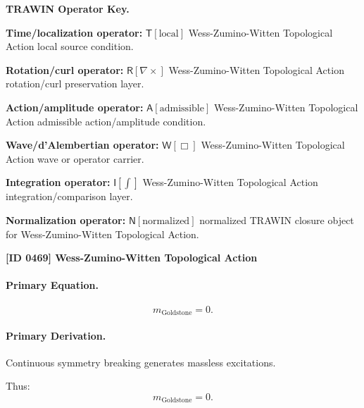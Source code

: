 \par\vspace{0.45\baselineskip}
\noindent\begin{minipage}[t]{\linewidth}
\begingroup
\small
\raggedright
\textbf{TRAWIN Operator Key.}\par
\noindent\textbf{Time/localization operator:} $\mathsf{T}\!\left[\mathrm{local}\right]$ Wess-Zumino-Witten Topological Action local source condition.\par
\noindent\textbf{Rotation/curl operator:} $\mathsf{R}\!\left[\nabla\times\right]$ Wess-Zumino-Witten Topological Action rotation/curl preservation layer.\par
\noindent\textbf{Action/amplitude operator:} $\mathsf{A}\!\left[\mathrm{admissible}\right]$ Wess-Zumino-Witten Topological Action admissible action/amplitude condition.\par
\noindent\textbf{Wave/d'Alembertian operator:} $\mathsf{W}\!\left[\Box\right]$ Wess-Zumino-Witten Topological Action wave or operator carrier.\par
\noindent\textbf{Integration operator:} $\mathsf{I}\!\left[\int\right]$ Wess-Zumino-Witten Topological Action integration/comparison layer.\par
\noindent\textbf{Normalization operator:} $\mathsf{N}\!\left[\mathrm{normalized}\right]$ normalized TRAWIN closure object for Wess-Zumino-Witten Topological Action.\par
\endgroup
\end{minipage}

\clearpage
\noindent\textbf{[ID 0469] Wess-Zumino-Witten Topological Action}\par
\vspace{0.35em}
\paragraph{Primary Equation.}
\begin{equation}
m_{\mathrm{Goldstone}} = 0.
\end{equation}

\paragraph{Primary Derivation.}
Continuous symmetry breaking generates massless excitations.

Thus:
\begin{equation}
\boxed{
m_{\mathrm{Goldstone}} = 0.
}
\end{equation}

